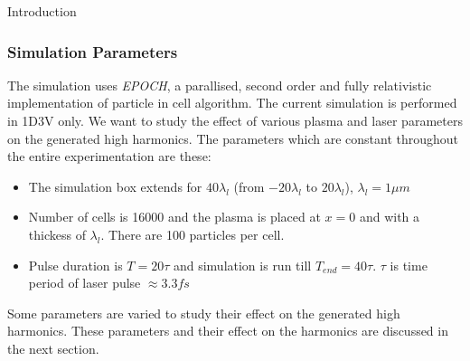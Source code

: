 \documentclass{beamer}
\begin{document}
\begin{frame}{Introduction}
\end{frame}

\begin{frame}
    \frametitle{Simulation Parameters}
    \small
    The simulation uses \textit{EPOCH}, a parallised, second order and fully relativistic implementation of particle in cell algorithm.\cite{EPOCH} The current simulation is performed in 1D3V only. We want to study the effect of various plasma and laser parameters on the generated high harmonics. The parameters which are constant throughout the entire experimentation are these:
    \begin{itemize}
        \item The simulation box extends for $40 \lambda _l$ (from $-20 \lambda _l$ to $20 \lambda _l$), $\lambda_l = 1 \mu m$
        \item Number of cells is 16000 and the plasma is placed at $x=0$ and with a thickess of $\lambda_l$. There are 100 particles per cell.
        \item Pulse duration is  $T = 20 \tau$ and simulation is run till $T_{end} = 40 \tau$. $\tau$ is time period of laser pulse $\approx 3.3 fs$
    \end{itemize}
    Some parameters are varied to study their effect on the generated high harmonics. These parameters and their effect on the harmonics are discussed in the next section.

\end{frame}
\end{document}
